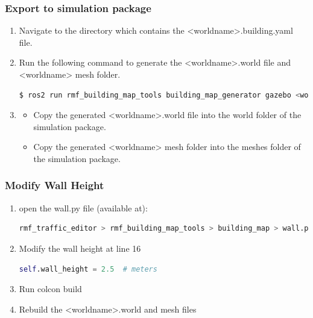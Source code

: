 \documentclass[11pt]{article}
\begin{document}
\subsubsection{Export to simulation package}
\begin{enumerate}
 \item {Navigate to the directory which contains the <worldname>.building.yaml file.}
 \item {
       Run the following command to generate the <worldname>.world file and <worldname> mesh folder.
       \begin{lstlisting}[language=bash]
        $ ros2 run rmf_building_map_tools building_map_generator gazebo <worldname>.building.yaml <worldname>.world .
        \end{lstlisting}
       }
 \item {
       \begin{itemize}
        \item {
              Copy the generated <worldname>.world file into the world folder of the simulation package.
              }
        \item {
              Copy the generated <worldname> mesh folder into the meshes folder of the simulation package.
              }
       \end{itemize}
       }
\end{enumerate}
\subsubsection{Modify Wall Height}
\begin{enumerate}
 \item {open the wall.py file (available at):
       \begin{lstlisting}[language=bash]
         rmf_traffic_editor > rmf_building_map_tools > building_map > wall.py
        \end{lstlisting}
       }
 \item {
       Modify the wall height at line 16
       \begin{lstlisting}[language=python]
        self.wall_height = 2.5  # meters
        \end{lstlisting}
       }
 \item {Run colcon build}
 \item{
       Rebuild the <worldname>.world and mesh files
       }
\end{enumerate}
\end{document}
